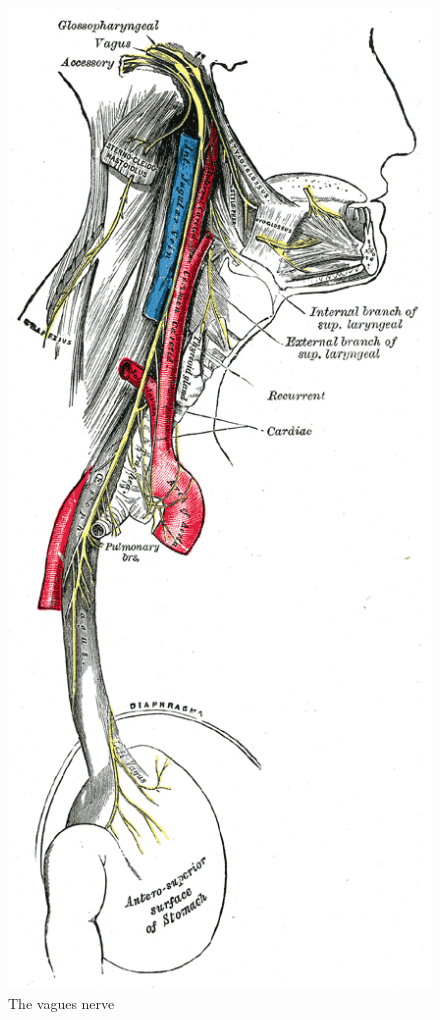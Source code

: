 \documentclass[12pt, letter]{report}
\begin{document}
\begin{figure}
\centering
\includegraphics[width=\linewidth]{vagus_nerve.png}
\caption{The vagues nerve \cite{Gray2000Anatomy}}
\label{fig:vagus_nerve}
\end{figure}
\end{document}

